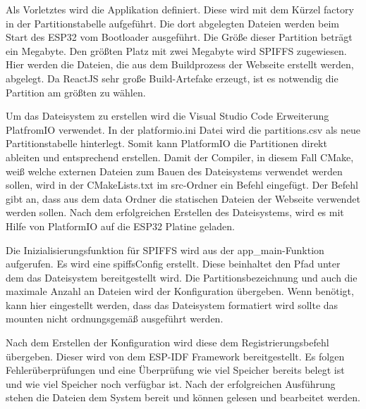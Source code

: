Als Vorletztes wird die Applikation definiert. Diese wird mit dem Kürzel  \glqq factory\grqq{} in der Partitionstabelle aufgeführt. Die dort abgelegten Dateien werden beim Start des ESP32 vom Bootloader ausgeführt. Die Größe dieser Partition beträgt ein Megabyte.
Den größten Platz mit zwei Megabyte wird SPIFFS zugewiesen. Hier werden die Dateien, die aus dem Buildprozess der Webseite erstellt werden, abgelegt. Da ReactJS sehr große Build-Artefake erzeugt, ist es notwendig die Partition am größten zu wählen.

Um das Dateisystem zu erstellen wird die Visual Studio Code Erweiterung PlatfromIO verwendet. In der \glqq platformio.ini\grqq{} Datei wird die \glqq partitions.csv\grqq{} als neue Partitionstabelle hinterlegt.
Somit kann PlatformIO die Partitionen direkt ableiten und entsprechend erstellen.
Damit der Compiler, in diesem Fall CMake, weiß welche externen Dateien zum Bauen des Dateisystems verwendet werden sollen, wird in der CMakeLists.txt im src-Ordner ein Befehl eingefügt.
Der Befehl gibt an, dass aus dem \glqq data\grqq{} Ordner die statischen Dateien der Webseite verwendet werden sollen.
Nach dem erfolgreichen Erstellen des Dateisystems, wird es mit Hilfe von PlatformIO auf die ESP32 Platine geladen.

Die Inizialisierungsfunktion für SPIFFS wird aus der app\_main-Funktion aufgerufen. Es wird eine spiffsConfig erstellt. Diese beinhaltet den Pfad unter dem das Dateisystem bereitgestellt wird. Die Partitionsbezeichnung und auch die maximale Anzahl an Dateien wird der Konfiguration übergeben.
Wenn benötigt, kann hier eingestellt werden, dass das Dateisystem formatiert wird sollte das mounten nicht ordnungsgemäß ausgeführt werden.

Nach dem Erstellen der Konfiguration wird diese dem Registrierungsbefehl übergeben. Dieser wird von dem ESP-IDF Framework bereitgestellt. Es folgen Fehlerüberprüfungen und eine Überprüfung wie viel Speicher bereits belegt ist und wie viel Speicher noch verfügbar ist.
Nach der erfolgreichen Ausführung stehen die Dateien dem System bereit und können gelesen und bearbeitet werden.

